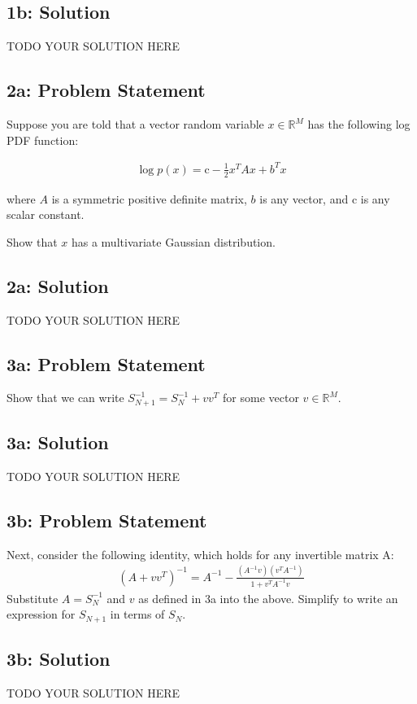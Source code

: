 \documentclass[10pt]{article}
\newcommand{\officialdirections}[1]{{\color{purple} #1}}
\begin{document}
\subsection{1b: Solution}
TODO YOUR SOLUTION HERE


\officialdirections{
\subsection*{2a: Problem Statement}
Suppose you are told that a vector random variable $x \in \mathbb{R}^M$ has the following log PDF function:

\begin{align}
\log p(x) = \text{c} - \frac{1}{2} x^T A x + b^T x
\end{align}

where $A$ is a symmetric positive definite matrix, $b$ is any vector, and $\text{c}$ is any scalar constant.

Show that $x$ has a multivariate Gaussian distribution.
}

\subsection{2a: Solution}
TODO YOUR SOLUTION HERE


\officialdirections{
\subsection*{3a: Problem Statement}
Show that we can write $S_{N+1}^{-1} = S_N^{-1} + vv^T$ for some vector $v \in \mathbb{R}^M$.
}


\subsection{3a: Solution}
TODO YOUR SOLUTION HERE

\officialdirections{
\subsection*{3b: Problem Statement}
Next, consider the following identity, which holds for any invertible matrix A:
\begin{align}
(A + vv^T)^{-1} = A^{-1} - \frac{ (A^{-1}v)(v^T A^{-1})}{ 1 + v^T A^{-1} v}
\end{align}
Substitute $A = S_N^{-1}$ and $v$ as defined in 3a into the above. Simplify to write an expression for $S_{N+1}$ in terms of $S_{N}$.
}

\subsection{3b: Solution}
TODO YOUR SOLUTION HERE
\end{document}
